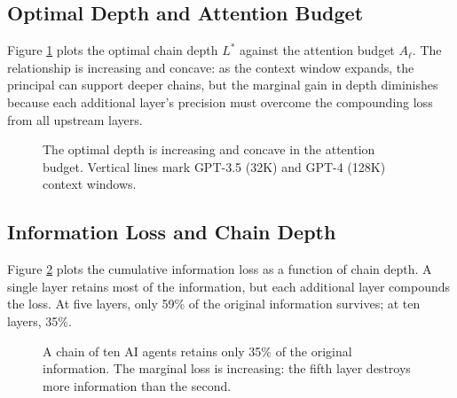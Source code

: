 \subsection{Optimal Depth and Attention Budget}
\label{subsec:optimal_depth_budget}

Figure \ref{fig:optimal_depth} plots the optimal chain depth $L^*$ against the attention budget $A_\ell$. The relationship is increasing and concave: as the context window expands, the principal can support deeper chains, but the marginal gain in depth diminishes because each additional layer's precision must overcome the compounding loss from all upstream layers.

\begin{figure}[htbp]
\centering
{}
\caption{The optimal depth is increasing and concave in the attention budget. Vertical lines mark GPT-3.5 (32K) and GPT-4 (128K) context windows.}
\label{fig:optimal_depth}
\end{figure}

\subsection{Information Loss and Chain Depth}
\label{subsec:info_loss}

Figure \ref{fig:info_loss} plots the cumulative information loss as a function of chain depth. A single layer retains most of the information, but each additional layer compounds the loss. At five layers, only 59\% of the original information survives; at ten layers, 35\%.

\begin{figure}[htbp]
\centering
{}
\caption{A chain of ten AI agents retains only 35\% of the original information. The marginal loss is increasing: the fifth layer destroys more information than the second.}
\label{fig:info_loss}
\end{figure}
